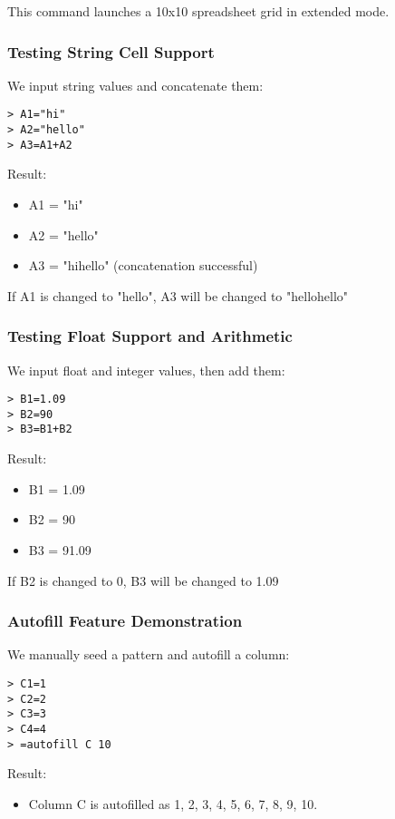 This command launches a 10x10 spreadsheet grid in extended mode.

\subsubsection*{Testing String Cell Support}

We input string values and concatenate them:

\begin{verbatim}
> A1="hi"
> A2="hello"
> A3=A1+A2
\end{verbatim}

Result:
\begin{itemize}
  \item A1 = "hi"
  \item A2 = "hello"
  \item A3 = "hihello" (concatenation successful)
\end{itemize}
If A1 is changed to "hello", A3 will be changed to "hellohello"
\subsubsection*{Testing Float Support and Arithmetic}

We input float and integer values, then add them:

\begin{verbatim}
> B1=1.09
> B2=90
> B3=B1+B2
\end{verbatim}

Result:
\begin{itemize}
  \item B1 = 1.09
  \item B2 = 90
  \item B3 = 91.09
\end{itemize}
If B2 is changed to 0, B3 will be changed to 1.09
\subsubsection*{Autofill Feature Demonstration}

We manually seed a pattern and autofill a column:

\begin{verbatim}
> C1=1
> C2=2
> C3=3
> C4=4
> =autofill C 10
\end{verbatim}

Result:
\begin{itemize}
  \item Column C is autofilled as 1, 2, 3, 4, 5, 6, 7, 8, 9, 10.
\end{itemize}

